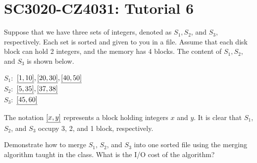 


\usepackage{amsfonts, amsmath, amssymb, amsthm}
\usepackage{comment}
\usepackage{graphicx}
\usepackage{ifthen}
\usepackage{latexsym}
\usepackage[normalem]{ulem}



\def\dom{\prec}
\def\T{\mathcal{T}}




\section*{SC3020-CZ4031: Tutorial 6}


 Suppose that we have three sets of integers, denoted as $S_1, S_2$, and $S_3$, respectively. Each set is sorted and given to you in a file. Assume that each disk block can hold 2 integers, and the memory has 4 blocks. The content of $S_1, S_2$, and $S_3$ is shown below.

\vgap

\noindent $S_1:$ $\uline{[1, 10]}, \uline{[20, 30]}, \uline{[40, 50]}$ \\
$S_2:$ $\uline{[5, 35]}, \uline{[37, 38]}$ \\
$S_3:$ $\uline{[45, 60]}$

\vgap

\noindent The notation $\uline{[x, y]}$ represents a block holding integers $x$ and $y$. It is clear that $S_1$, $S_2$, and $S_3$ occupy 3, 2, and 1 block, respectively.

\vgap

Demonstrate how to merge $S_1$, $S_2$, and $S_3$ into one sorted file using the merging algorithm taught in the class. What is the I/O cost of the algorithm?

